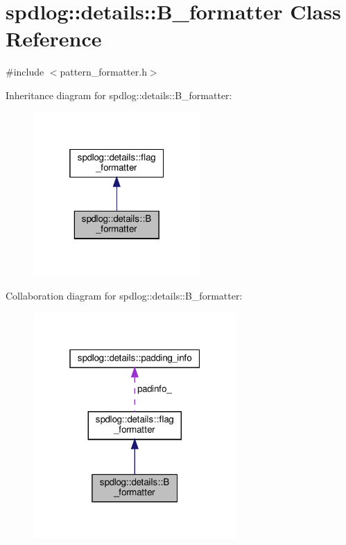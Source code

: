 \hypertarget{classspdlog_1_1details_1_1_b__formatter}{}\section{spdlog\+:\+:details\+:\+:B\+\_\+formatter Class Reference}
\label{classspdlog_1_1details_1_1_b__formatter}


{\ttfamily \#include $<$pattern\+\_\+formatter.\+h$>$}



Inheritance diagram for spdlog\+:\+:details\+:\+:B\+\_\+formatter\+:
\nopagebreak
\begin{figure}[H]
\begin{center}
\leavevmode
\includegraphics[width=181pt]{classspdlog_1_1details_1_1_b__formatter__inherit__graph}
\end{center}
\end{figure}


Collaboration diagram for spdlog\+:\+:details\+:\+:B\+\_\+formatter\+:
\nopagebreak
\begin{figure}[H]
\begin{center}
\leavevmode
\includegraphics[width=220pt]{classspdlog_1_1details_1_1_b__formatter__coll__graph}
\end{center}
\end{figure}
